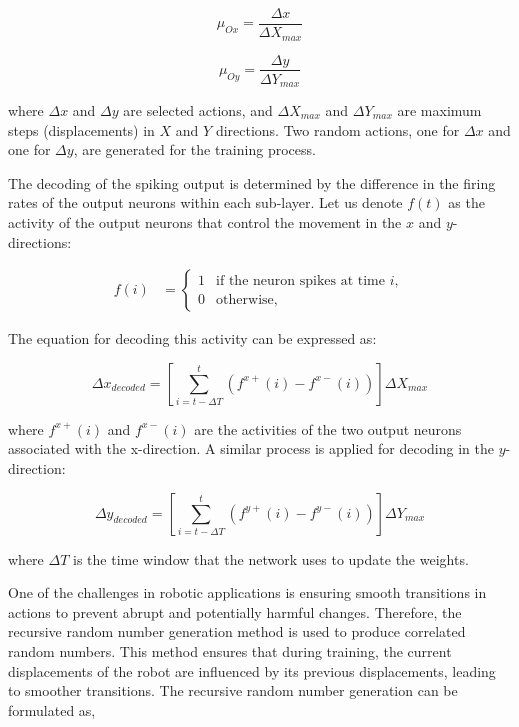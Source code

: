 \begin{equation} \label{Eq.NS.4}
    \mu_{Ox} = \frac{\Delta x}{\Delta X_{max}}
\end{equation}

\begin{equation} \label{Eq.NS.5}
    \mu_{Oy} = \frac{\Delta y}{\Delta Y_{max}}
\end{equation}

\noindent where \(\Delta x\) and \(\Delta y\) are selected actions, and \(\Delta X_{max}\) and \(\Delta Y_{max}\) are maximum steps (displacements) in \(X\) and \(Y\) directions. Two random actions, one for \(\Delta x\) and one for \(\Delta y\), are generated for the training process.

The decoding of the spiking output is determined by the difference in the firing rates of the output neurons within each sub-layer. Let us denote \(f(t)\) as the activity of the output neurons that control the movement in the $x$ and $y$-directions:

\begin{align*}
    f(i) &= 
    \begin{cases} 
        1 & \text{if the neuron spikes at time } i, \\
        0 & \text{otherwise},
    \end{cases}
\end{align*}

The equation for decoding this activity can be expressed as:

\begin{equation} \label{Eq.NS.6}
    \Delta x_{decoded} = \left[ \sum_{i=t-\Delta T}^{t} \left(f^{x+}(i)-f^{x-}(i)\right) \right]\Delta X_{max}
\end{equation}

\noindent where \(f^{x+}(i)\) and \(f^{x-}(i)\) are the activities of the two output neurons associated with the x-direction. A similar process is applied for decoding in the $y$-direction:

\begin{equation} \label{Eq.NS.7}
    \Delta y_{decoded} = \left[ \sum_{i=t-\Delta T}^{t} \left(f^{y+}(i)-f^{y-}(i)\right) \right]\Delta Y_{max}
\end{equation}

\noindent where \(\Delta T\) is the time window that the network uses to update the weights.

One of the challenges in robotic applications is ensuring smooth transitions in actions to prevent abrupt and potentially harmful changes. Therefore, the recursive random number generation method is used to produce correlated random numbers. This method ensures that during training, the current displacements of the robot are influenced by its previous displacements, leading to smoother transitions. The recursive random number generation can be formulated as,

